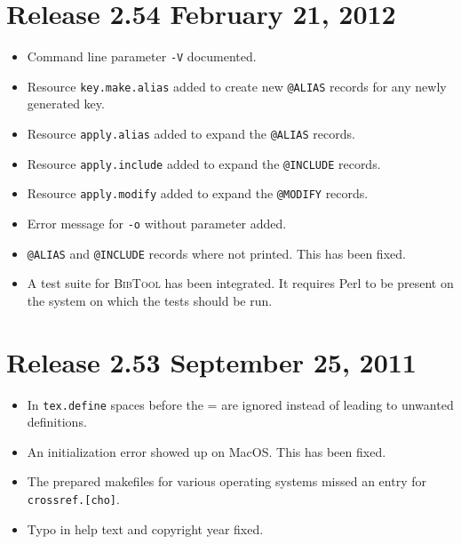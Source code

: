 \documentclass[11pt,a4paper]{scrartcl}
\newcommand\Arg[1]{\texttt{#1}}
\newcommand\rsc[1]{\texttt{#1}}
\newcommand\BibTool{\textsc{BibTool}}
\newenvironment{Release}[2]{%
  \def\tmp{#2}%
  \section*{Release #1 \ifx\tmp\empty\else{\normalsize[#2]}\fi}
  \begin{itemize}
}{\end{itemize}}
\newenvironment{Fix}[1]{\item }{}
\newenvironment{New}[1]{\item }{}
\newenvironment{Update}[1]{\item }{}
\begin{document}
\begin{multicols}
 \begin{Release}{2.54}{February 21, 2012}
  \begin{New}{gene}
    Command line parameter \Arg{-V} documented.
  \end{New}
  \begin{New}{gene}
    Resource \rsc{key.make.alias} added to create new \texttt{@ALIAS}
    records for any newly generated key.
  \end{New}
  \begin{New}{gene}
    Resource \rsc{apply.alias} added to expand the \texttt{@ALIAS}
    records.
  \end{New}
  \begin{New}{gene}
    Resource \rsc{apply.include} added to expand the \texttt{@INCLUDE}
    records.
  \end{New}
  \begin{New}{gene}
    Resource \rsc{apply.modify} added to expand the \texttt{@MODIFY}
    records.
  \end{New}
  \begin{Update}{gene}
    Error message for \Arg{-o} without parameter added.
  \end{Update}
  \begin{Fix}{gene}
    \texttt{@ALIAS} and \texttt{@INCLUDE} records where not printed.
    This has been fixed.
  \end{Fix}
  \begin{New}{gene}
    A test suite for \BibTool{} has been integrated. It requires Perl
    to be present on the system on which the tests should be run.
  \end{New}
 \end{Release}

 \begin{Release}{2.53}{September 25, 2011}
  \begin{Update}{gene}
    In \texttt{tex.define} spaces before the = are ignored instead of
    leading to unwanted definitions.
  \end{Update}
  \begin{Fix}{gene}
    An initialization error showed up on MacOS. This has been fixed.
  \end{Fix}
  \begin{Fix}{gene}
    The prepared makefiles for various operating systems missed an
    entry for \texttt{crossref.[cho]}.
  \end{Fix}
  \begin{Fix}{gene}
    Typo in help text and copyright year fixed.
  \end{Fix}
 \end{Release}


\end{multicols}
\end{document}
